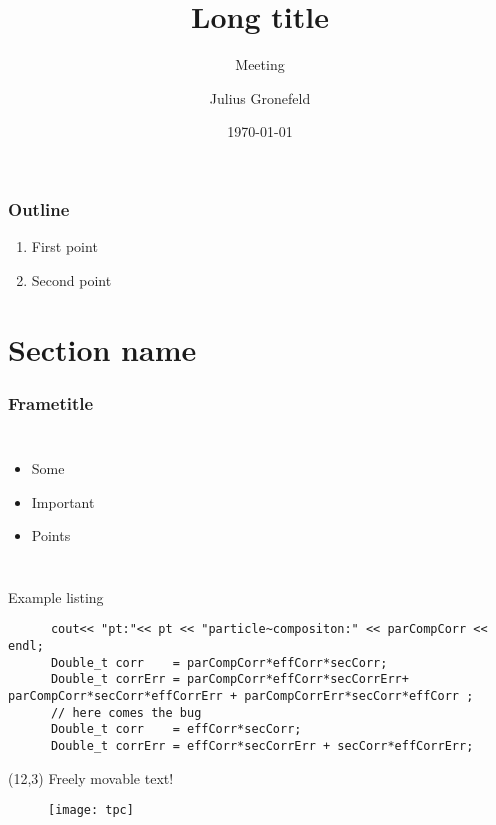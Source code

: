 
\author[J. Gronefeld]{Julius Gronefeld } %
\title[Short title]{Long title}
\subtitle[ | Meeting]{Meeting}
\date{\today}

{
\begin{frame}[t,plain]
\titlepage

\end{frame}
}


\begin{frame}
\frametitle{Outline}
\begin{enumerate}
	\item First point
	\item Second point
\end{enumerate}
\end{frame}

\section{Section name}
\begin{frame}
\frametitle{Frametitle}

\begin{columns}[t]
	\begin{itemize}
		\item Some 
		\item Important
		\item Points
	\end{itemize}
\end{columns}
\end{frame}	

\begin{frame}[fragile]{Example listing}


	\begin{lstlisting}
	  cout<< "pt:"<< pt << "particle~compositon:" << parCompCorr << endl;	  
	  Double_t corr    = parCompCorr*effCorr*secCorr;	  
	  Double_t corrErr = parCompCorr*effCorr*secCorrErr+ parCompCorr*secCorr*effCorrErr + parCompCorrErr*secCorr*effCorr ; 	  
	  // here comes the bug	  
	  Double_t corr    = effCorr*secCorr;	  
	  Double_t corrErr = effCorr*secCorrErr + secCorr*effCorrErr;  
	\end{lstlisting} 
	
	\begin{textblock}{2.5}(12,3)
	{\tiny Freely movable text!}
	\begin{figure}
	\texttt{[image: tpc]}
	\end{figure}
\end{textblock}
\end{frame}	


